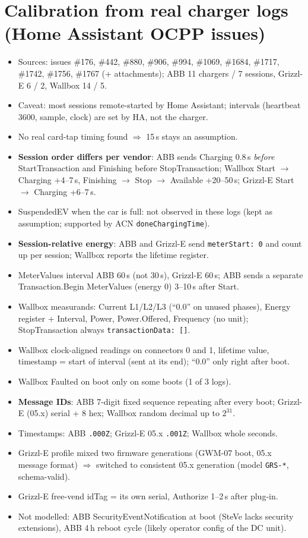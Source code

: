 \documentclass[11pt]{article}
\begin{document}
\section{Calibration from real charger logs (Home Assistant OCPP issues)}
\begin{itemize}
  \item Sources: issues \#176, \#442, \#880, \#906, \#994, \#1069, \#1684, \#1717, \#1742, \#1756, \#1767 (+ attachments); ABB 11 chargers / 7 sessions, Grizzl-E 6 / 2, Wallbox 14 / 5.
  \item Caveat: most sessions remote-started by Home Assistant; intervals (heartbeat 3600, sample, clock) are set by HA, not the charger.
  \item No real card-tap timing found $\Rightarrow$ 15\,s stays an assumption.
  \item \textbf{Session order differs per vendor}: ABB sends Charging 0.8\,s \emph{before} StartTransaction and Finishing before StopTransaction; Wallbox Start $\to$ Charging +4--7\,s, Finishing $\to$ Stop $\to$ Available +20--50\,s; Grizzl-E Start $\to$ Charging +6--7\,s.
  \item SuspendedEV when the car is full: not observed in these logs (kept as assumption; supported by ACN \texttt{doneChargingTime}).
  \item \textbf{Session-relative energy}: ABB and Grizzl-E send \texttt{meterStart: 0} and count up per session; Wallbox reports the lifetime register.
  \item MeterValues interval ABB 60\,s (not 30\,s), Grizzl-E 60\,s; ABB sends a separate Transaction.Begin MeterValues (energy 0) 3--10\,s after Start.
  \item Wallbox measurands: Current L1/L2/L3 (``0.0'' on unused phases), Energy register + Interval, Power, Power.Offered, Frequency (no unit); StopTransaction always \texttt{transactionData: []}.
  \item Wallbox clock-aligned readings on connectors 0 and 1, lifetime value, timestamp = start of interval (sent at its end); ``0.0'' only right after boot.
  \item Wallbox Faulted on boot only on some boots (1 of 3 logs).
  \item \textbf{Message IDs}: ABB 7-digit fixed sequence repeating after every boot; Grizzl-E (05.x) serial + 8 hex; Wallbox random decimal up to $2^{31}$.
  \item Timestamps: ABB \texttt{.000Z}; Grizzl-E 05.x \texttt{.001Z}; Wallbox whole seconds.
  \item Grizzl-E profile mixed two firmware generations (GWM-07 boot, 05.x message format) $\Rightarrow$ switched to consistent 05.x generation (model \texttt{GRS-*}, schema-valid).
  \item Grizzl-E free-vend idTag = its own serial, Authorize 1--2\,s after plug-in.
  \item Not modelled: ABB SecurityEventNotification at boot (SteVe lacks security extensions), ABB 4\,h reboot cycle (likely operator config of the DC unit).
\end{itemize}
\end{document}
